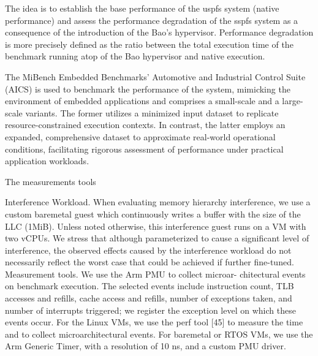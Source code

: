 The idea is to establish the base performance of the \gls{uspfs} system (native
performance) and assess the performance degradation of the \gls{sspfs} system as
a consequence of the introduction of the Bao's hypervisor. Performance
degradation is more precisely defined as the ratio between the total execution
time of the benchmark running atop of the Bao hypervisor and native execution.

The MiBench Embedded Benchmarks' Automotive and Industrial Control Suite (AICS)
is used to benchmark the performance of the system, mimicking the environment of
embedded applications and comprises a small-scale and a large-scale variants. The former utilizes a minimized
input dataset to replicate resource-constrained execution contexts. In contrast, the latter employs an
expanded, comprehensive dataset to approximate real-world operational
conditions, facilitating rigorous assessment of performance under practical
application workloads.

The measurements tools 

Interference Workload. When evaluating memory hierarchy
interference, we use a custom baremetal guest which continuously writes a buffer with the size of the LLC (1MiB). Unless
noted otherwise, this interference guest runs on a VM with
two vCPUs. We stress that although parameterized to cause a
significant level of interference, the observed effects caused by
the interference workload do not necessarily reflect the worst
case that could be achieved if further fine-tuned.
Measurement tools. We use the Arm PMU to collect microar-
chitectural events on benchmark execution. The selected events
include instruction count, TLB accesses and refills, cache
access and refills, number of exceptions taken, and number of
interrupts triggered; we register the exception level on which
these events occur. For the Linux VMs, we use the perf tool
[45] to measure the time and to collect microarchitectural
events. For baremetal or RTOS VMs, we use the Arm Generic
Timer, with a resolution of 10 ns, and a custom PMU driver.



